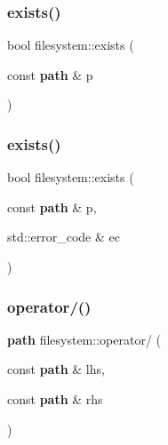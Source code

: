 \subsubsection{exists()\hspace{0.1cm}{\footnotesize\ttfamily [1/2]}}
{\footnotesize\ttfamily bool filesystem\+::exists (\begin{DoxyParamCaption}\item[{const \textbf{ path} \&}]{p }\end{DoxyParamCaption})}

\mbox{\label{namespacefilesystem_a5afe12710146c602a4e2b4ba81fcdfe8}} 
\subsubsection{exists()\hspace{0.1cm}{\footnotesize\ttfamily [2/2]}}
{\footnotesize\ttfamily bool filesystem\+::exists (\begin{DoxyParamCaption}\item[{const \textbf{ path} \&}]{p,  }\item[{std\+::error\+\_\+code \&}]{ec }\end{DoxyParamCaption})}

\mbox{\label{namespacefilesystem_a0ddf870f384e61dc7d5e4eebe5661f5e}} 
\subsubsection{operator/()}
{\footnotesize\ttfamily \textbf{ path} filesystem\+::operator/ (\begin{DoxyParamCaption}\item[{const \textbf{ path} \&}]{lhs,  }\item[{const \textbf{ path} \&}]{rhs }\end{DoxyParamCaption})\hspace{0.3cm}{\ttfamily [inline]}}

